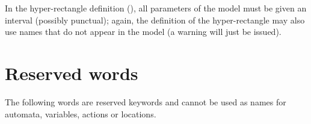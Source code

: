 \begin{remark}
	In the hyper-rectangle definition (), all parameters of the model must be given an interval (possibly punctual); again, the definition of the hyper-rectangle may also use names that do not appear in the model (a warning will just be issued).
\end{remark}





\section{Reserved words}

The following words are reserved keywords and cannot be used as names for automata, variables, actions or locations.

